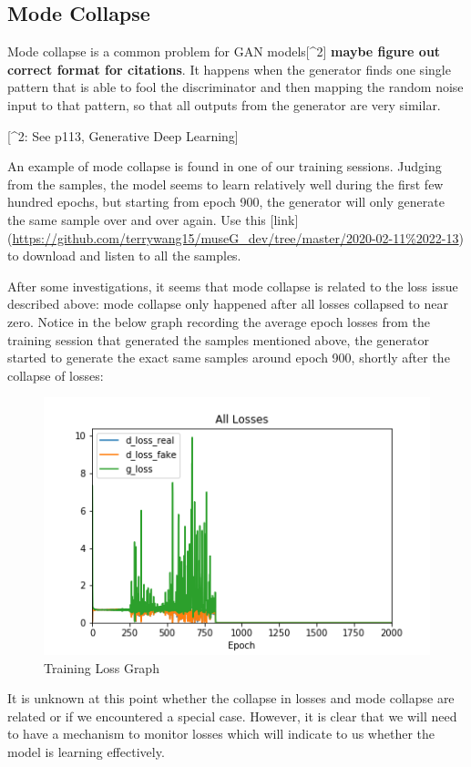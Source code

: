\documentclass[12pt,oneside]{chicagocapstone}
\begin{document}
\hypertarget{mode-collapse}{%
\subsection*{Mode Collapse}\label{mode-collapse}}

Mode collapse is a common problem for GAN models{[}\^{}2{]} \textbf{maybe figure out correct format for citations}. It happens when the generator finds one single pattern that is able to fool the discriminator and then mapping the random noise input to that pattern, so that all outputs from the generator are very similar.

{[}\^{}2: See p113, Generative Deep Learning{]}

An example of mode collapse is found in one of our training sessions. Judging from the samples, the model seems to learn relatively well during the first few hundred epochs, but starting from epoch 900, the generator will only generate the same sample over and over again. Use this {[}link{]} (\url{https://github.com/terrywang15/museG_dev/tree/master/2020-02-11\%2022-13}) to download and listen to all the samples.

After some investigations, it seems that mode collapse is related to the loss issue described above: mode collapse only happened after all losses collapsed to near zero. Notice in the below graph recording the average epoch losses from the training session that generated the samples mentioned above, the generator started to generate the exact same samples around epoch 900, shortly after the collapse of losses:
\begin{figure}

{\centering \includegraphics[width=0.3\linewidth]{figure/all_losses_2} 

}

\caption{Training Loss Graph}\label{fig:unnamed-chunk-4}
\end{figure}
It is unknown at this point whether the collapse in losses and mode collapse are related or if we encountered a special case. However, it is clear that we will need to have a mechanism to monitor losses which will indicate to us whether the model is learning effectively.
\end{document}
